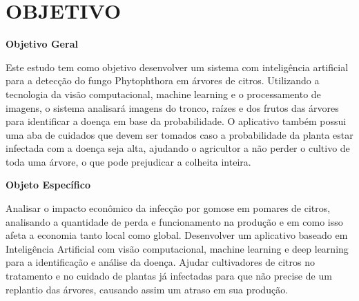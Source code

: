 \documentclass[
  a4paper,%
  12pt,%
  english,%
  brazilian,%
]{article}
\begin{document}
\section*{OBJETIVO}
\textbf{Objetivo Geral} 

Este estudo tem como objetivo desenvolver um sistema com inteligência artificial para a detecção do fungo Phytophthora em árvores de citros. Utilizando a tecnologia da visão computacional, machine learning e o processamento de imagens, o sistema analisará imagens do tronco, raízes e dos frutos das árvores para identificar a doença em base da probabilidade. O aplicativo também possui uma aba de cuidados que devem ser tomados caso a probabilidade da planta estar infectada com a doença seja alta, ajudando o agricultor a não perder o cultivo de toda uma árvore, o que pode prejudicar a colheita inteira.  

\textbf{Objeto Específico}

Analisar o impacto econômico da infecção por gomose em pomares de citros, analisando a quantidade de perda e funcionamento na produção e em como isso afeta a economia tanto local como global.
Desenvolver um aplicativo baseado em Inteligência Artificial com visão computacional, machine learning e deep learning para a identificação e análise da doença.
Ajudar cultivadores de citros no tratamento e no cuidado de plantas já infectadas para que não precise de um replantio das árvores, causando assim um atraso em sua produção. \label{sect:obj}


\end{document}
